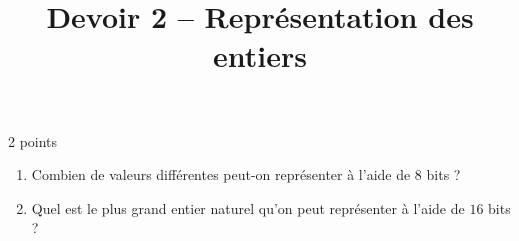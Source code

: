 \documentclass[a4paper,dvipsnames]{article}
\title{Devoir 2 -- Représentation des entiers}
\author{}
\date{}
\begin{document}
\renewcommand{\contentsname}{}

\pagestyle{fancy}

\begin{tcolorbox}[colframe=blue!75, colback=blue!45, valign=center, height=1.5cm, top=5mm]
  \maketitle
\end{tcolorbox}


\vspace{1cm}

\thispagestyle{fancy}

\begin{exercice}{2 points}{}
 \begin{enumerate}
   \item Combien de valeurs différentes peut-on représenter à l'aide de $8$ bits ?
   \item Quel est le plus grand entier naturel qu'on peut représenter à l'aide de $16$ bits ?
 \end{enumerate} 
\end{exercice}

\medskip
\end{document}
